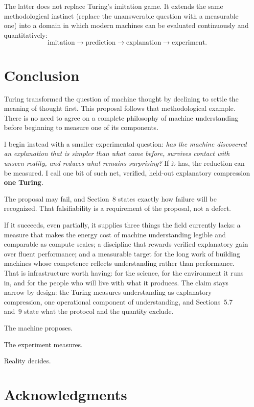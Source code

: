\documentclass[11pt]{article}
\begin{document}
The latter does not replace Turing's imitation game. It extends the same methodological instinct (replace the unanswerable question with a measurable one) into a domain in which modern machines can be evaluated continuously and quantitatively:
\[
\text{imitation}
\rightarrow
\text{prediction}
\rightarrow
\text{explanation}
\rightarrow
\text{experiment}.
\]

\section{Conclusion}

Turing transformed the question of machine thought by declining to settle the meaning of thought first. This proposal follows that methodological example. There is no need to agree on a complete philosophy of machine understanding before beginning to measure one of its components.

I begin instead with a smaller experimental question: \textit{has the machine discovered an explanation that is simpler than what came before, survives contact with unseen reality, and reduces what remains surprising?} If it has, the reduction can be measured. I call one bit of such net, verified, held-out explanatory compression \textbf{one Turing}.

The proposal may fail, and Section~8 states exactly how failure will be recognized. That falsifiability is a requirement of the proposal, not a defect.

If it succeeds, even partially, it supplies three things the field currently lacks: a measure that makes the energy cost of machine understanding legible and comparable as compute scales; a discipline that rewards verified explanatory gain over fluent performance; and a measurable target for the long work of building machines whose competence reflects understanding rather than performance. That is infrastructure worth having: for the science, for the environment it runs in, and for the people who will live with what it produces. The claim stays narrow by design: the Turing measures understanding-as-explanatory-compression, one operational component of understanding, and Sections~5.7 and~9 state what the protocol and the quantity exclude.

The machine proposes.

The experiment measures.

Reality decides.

\section*{Acknowledgments}
\end{document}
